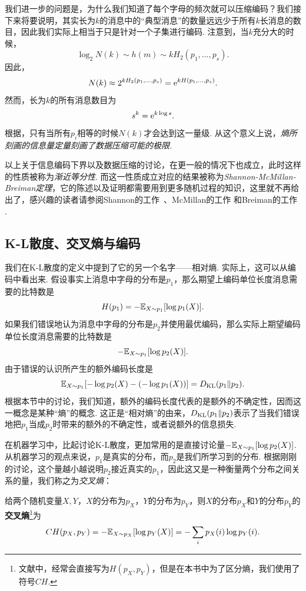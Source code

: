 我们进一步的问题是，为什么我们知道了每个字母的频次就可以压缩编码？我们接下来将要说明，其实长为$k$的消息中的“典型消息”的数量远远少于所有$k$长消息的数目，因此我们实际上相当于只是针对一个子集进行编码. 注意到，当$k$充分大的时候，
\[\log_2 N(k)\sim h(m)\sim kH_2(p_1,\dots,p_s).\]
因此，
\[N(k)\approx 2^{kH_2(p_1,\dots,p_s)}=\mathrm{e}^{kH(p_1,\dots,p_s)}.\]
然而，长为$k$的所有消息数目为
\[s^k=\mathrm{e}^{k\log s}.\]
根据，只有当所有$p_i$相等的时候$N(k)$才会达到这一量级. 从这个意义上说，\textit{熵所刻画的信息量定量刻画了数据压缩可能的极限.}

以上关于信息编码下界以及数据压缩的讨论，在更一般的情况下也成立，此时这样的性质被称为\textit{渐近等分性}. 而这一性质成立对应的结果被称为\textit{Shannon-McMillan-Breiman定理}，它的陈述以及证明都需要用到更多随机过程的知识，这里就不再给出了，感兴趣的读者请参阅Shannon的工作~\cite{shannonMathematicalTheoryCommunication1948}、McMillan的工作 \cite{mcmillanBasicTheoremsInformation1953} 和Breiman的工作 \cite{breimanIndividualErgodicTheorem1957}. 

\subsection{K-L散度、交叉熵与编码}

我们在K-L散度的定义中提到了它的另一个名字——相对熵. 实际上，这可以从编码中看出来. 假设事实上消息中字母的分布是$p_1$，那么期望上编码单位长度消息需要的比特数是
\[H(p_1)=-\mathbb{E}_{X\sim p_1}[\log p_1(X)].\] 
如果我们错误地认为消息中字母的分布是$p_2$并使用最优编码，那么实际上期望编码单位长度消息需要的比特数是
\[-\mathbb{E}_{X\sim p_1}[\log p_2(X)].\]
由于错误的认识所产生的额外编码长度是
\[\mathbb{E}_{X\sim p_1}[-\log p_2(X)-(-\log p_1(X))]=D_{\mathrm{KL}}(p_1\Vert p_2).\]
根据本节中的讨论，我们知道，额外的编码长度代表的是额外的不确定性，因而这一概念是某种“熵”的概念. 这正是“相对熵”的由来，$D_{\mathrm{KL}}(p_1\Vert p_2)$表示了当我们错误地把$p_1$当成$p_2$时带来的额外的不确定性，或者说额外的信息损失.

在机器学习中，比起讨论K-L散度，更加常用的是直接讨论量$-\mathbb{E}_{X\sim p_1}[\log p_2(X)]$. 从机器学习的观点来说，$p_1$是真实的分布，而$p_2$是我们所学习到的分布. 根据刚刚的讨论，这个量越小越说明$p_2$接近真实的$p_1$，因此这又是一种衡量两个分布之间关系的量，我们称之为\textit{交叉熵}：
\begin{definition}[交叉熵]
给两个随机变量$X,Y$，$X$的分布为$p_X$，$Y$的分布为$p_Y$，则$X$的分布$p_X$和$Y$的分布$p_Y$的\textbf{交叉熵}\footnote{文献中，经常会直接写为$H(p_X,p_Y)$，但是在本书中为了区分熵，我们使用了符号$CH$.}为
\[CH(p_X,p_Y)=-\mathbb{E}_{X\sim p_X}[\log p_Y(X)]=-\sum_ip_X(i)\log p_Y(i).\]
\end{definition}

